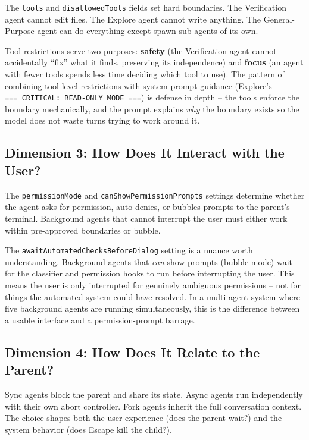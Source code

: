 \documentclass[
  english,
  11pt,
  letterpaper,
]{book}
\begin{document}
The \texttt{tools} and \texttt{disallowedTools} fields set hard
boundaries. The Verification agent cannot edit files. The Explore agent
cannot write anything. The General-Purpose agent can do everything
except spawn sub-agents of its own.

Tool restrictions serve two purposes: \textbf{safety} (the Verification
agent cannot accidentally ``fix'' what it finds, preserving its
independence) and \textbf{focus} (an agent with fewer tools spends less
time deciding which tool to use). The pattern of combining tool-level
restrictions with system prompt guidance (Explore's
\texttt{===\ CRITICAL:\ READ-ONLY\ MODE\ ===}) is defense in depth --
the tools enforce the boundary mechanically, and the prompt explains
\emph{why} the boundary exists so the model does not waste turns trying
to work around it.

\subsection{Dimension 3: How Does It Interact with the
User?}\label{dimension-3-how-does-it-interact-with-the-user}

The \texttt{permissionMode} and \texttt{canShowPermissionPrompts}
settings determine whether the agent asks for permission, auto-denies,
or bubbles prompts to the parent's terminal. Background agents that
cannot interrupt the user must either work within pre-approved
boundaries or bubble.

The \texttt{awaitAutomatedChecksBeforeDialog} setting is a nuance worth
understanding. Background agents that \emph{can} show prompts (bubble
mode) wait for the classifier and permission hooks to run before
interrupting the user. This means the user is only interrupted for
genuinely ambiguous permissions -- not for things the automated system
could have resolved. In a multi-agent system where five background
agents are running simultaneously, this is the difference between a
usable interface and a permission-prompt barrage.

\subsection{Dimension 4: How Does It Relate to the
Parent?}\label{dimension-4-how-does-it-relate-to-the-parent}

Sync agents block the parent and share its state. Async agents run
independently with their own abort controller. Fork agents inherit the
full conversation context. The choice shapes both the user experience
(does the parent wait?) and the system behavior (does Escape kill the
child?).
\end{document}

